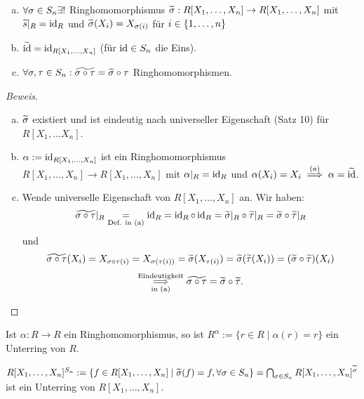 \documentclass[a4paper]{report}
\begin{document}
\begin{lemm}
\begin{enumerate}[(a)]
  \item $\forall \sigma \in S_n \exists !$ Ringhomomorphismus $\widetilde {\sigma} : R[X_{1}, \ldots, X_{n}] \to R[X_{1}, \ldots, X_{n}]$ mit $\widetilde s|_{R} = \operatorname{id}_{R}$ und $\widetilde {\sigma}(X_{i}) = X_{\sigma(i)}$ für $i \in \{1, \ldots, n\}$
  \item $\widetilde{\operatorname{id}} = \operatorname{id}_{R[X_{1}, \ldots, X_{n}]}$ (für $\operatorname{id} \in S_n$ die Eins).
  \item $\forall \sigma, \tau \in S_n : \widetilde{\sigma \circ \tau} = \widetilde {\sigma} \circ \tau$ Ringhomomorphismen.
\end{enumerate}
\begin{proof}[Beweis]
\begin{enumerate}[(a)]
  \item $\widetilde {\sigma}$ existiert und ist eindeutig nach universeller Eigenschaft (Satz 10) für $R[X_{1}, \ldots X_{n}]$.
  \item $\alpha:= \operatorname{id}_{R[X_{1}, \ldots, X_{n}]}$ ist ein Ringhomomorphismus $R[X_{1}, \ldots, X_{n}] \to R[X_{1}, \ldots, X_{n}]$ mit $\alpha|_{R} = \operatorname{id}_{R}$ und $\alpha(X_{i}) = X_i \overset{(a)}{\implies} \alpha = \widetilde {\operatorname{id}}$.
  \item Wende universelle Eigenschaft von $R[X_{1}, \ldots, X_{n}]$ an. Wir haben:
        \[\widetilde{\sigma \circ \tau}|_{R} \underset{\text{Def. in (a)}}= \operatorname{id}_{R} = \operatorname{id}_{R} \circ \operatorname{id}_{R} = \widetilde {\sigma}|_{R} \circ \widetilde \tau|_{R} = \widetilde {\sigma} \circ \widetilde \tau |_{R}\]
        und
        \[\widetilde{\sigma \circ \tau}(X_{i})= X_{\sigma \circ \tau(i)} = X_{\sigma(\tau(i))} = \widetilde {\sigma}(X_{\tau(i)}) = \widetilde {\sigma}(\widetilde \tau(X_{i})) = (\widetilde {\sigma} \circ \widetilde \tau)(X_{i})\]
        \[ \overunderset{\text{Eindeutigkeit}}{\text{in (a)}} \imp \tilde{\s \circ \tau} = \tilde \s \circ \tilde \tau. \qedhere\]
\end{enumerate}
\end{proof}
\end{lemm}

\begin{bem*}[Übung] Ist $\alpha : R \to R$ ein Ringhomomorphismus, so ist $R^{\alpha} := \{r \in R \mid \alpha(r) = r\}$ ein Unterring von $R$.

\end{bem*}

\begin{kor}
$R[X_{1}, \ldots, X_{n}]^{S_{n}} := \{f \in R[X_{1}, \ldots, X_{n}] \mid \widetilde {\sigma} (f) = f, \forall \sigma \in S_n\} = \bigcap_{\sigma \in S_n}R[X_{1}, \ldots, X_{n}]^{\widetilde {\sigma}}$ ist ein Unterring von $R[X_{1}, \ldots, X_{n}]$.
\end{kor}
\end{document}

